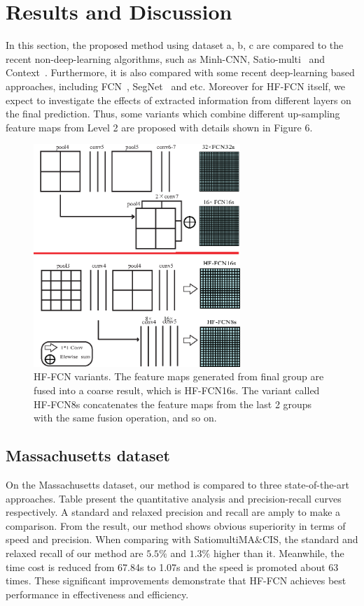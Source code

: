 \section{Results and Discussion}
\label{Sec:Res}

In this section, the proposed method using dataset a, b, c are compared to the recent non-deep-learning algorithms, such as Minh-CNN\cite{IEEEexample:mnih2013machine}, Satio-multi~\cite{IEEEexample:saito2016multiple} and Context~\cite{IEEEexample:audebert2017deep}.
%
Furthermore, it is also compared with some recent deep-learning based approaches, including FCN~\cite{IEEEexample:Long_2015_CVPR}, SegNet~\cite{IEEEexample:badrinarayanan2017segnet} and etc. 
Moreover for HF-FCN itself, we expect to investigate the effects of extracted information from different layers on the final prediction. 
Thus, some variants which combine different up-sampling feature maps from Level 2 are proposed with details shown in Figure 6.

\begin{figure}[t]
\begin{center}
\includegraphics[width=7.8cm]{Figures/vairants.eps}
\caption{HF-FCN variants. The feature maps generated from final group are fused into a coarse result, which is HF-FCN16s. The variant called HF-FCN8s concatenates the feature maps from the last 2 groups with the same fusion operation, and so on.}
\label{6}
\end{center}
\end{figure}

\subsection{Massachusetts dataset}
On the Massachusetts dataset, our method is compared to three state-of-the-art approaches. Table  present the quantitative analysis and precision-recall curves respectively. A standard and relaxed precision and recall are amply to make a comparison. 
From the result, our method shows obvious superiority in terms of speed and precision. When comparing with Satio\-multi\-MA\&CIS, the standard and relaxed recall of our method are $5.5\%$ and $1.3\%$ higher than it. Meanwhile, the time cost is reduced from 67.84s to 1.07s and the speed is promoted about 63 times. 
These significant improvements demonstrate that HF-FCN achieves best performance in effectiveness and efficiency.

